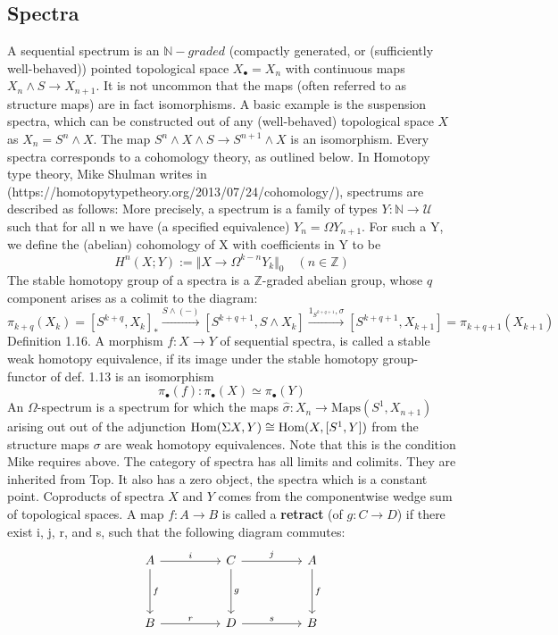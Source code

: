 \subsection{Spectra}
A sequential spectrum is an $\mathbb{N}-graded$ (compactly generated, or (sufficiently well-behaved)) pointed topological space $X_{\bullet} = X_n$ with continuous maps $X_n \land S \to X_{n+1}$. It is not uncommon that the maps (often referred to as structure maps) are in fact isomorphisms.
A basic example is the suspension spectra, which can be constructed out of any (well-behaved) topological space $X$ as $X_n = S^n \land X$. The map $S^n \land X \land S \to S^{n+1} \land X$ is an isomorphism.
Every spectra corresponds to a cohomology theory, as outlined below.
In Homotopy type theory, Mike Shulman writes in (https://homotopytypetheory.org/2013/07/24/cohomology/), spectrums are described as follows:
More precisely, a spectrum is a family of types $Y : \mathbb{N} \to \mathcal{U}$ such that for all n we have (a specified equivalence) $Y_n = \Omega Y_{n+1}$.
For such a Y, we define the (abelian) cohomology of X with coefficients in Y to be
\[
H^n(X;Y) := \Vert X \to \Omega^{k-n} Y_k \Vert_0 \quad (n \in \mathbb{Z})
\]
The stable homotopy group of a spectra is a $\mathbb{Z}$-graded abelian group, whose $q$ component arises as a colimit to the diagram:
\[
\pi_{k+q}(X_k) = [S^{k+q}, X_k]_* \xrightarrow{S \land (-)} [S^{k+q+1}, S \land X_{k}] \xrightarrow{1_{S^{k+q+1}}, \sigma} [S^{k+q+1}, X_{k+1}] = \pi_{k+q+1}(X_{k+1})
\]
Definition 1.16. A morphism $f: X \to Y$ of sequential spectra, is called a stable weak homotopy equivalence, if its image under the stable homotopy group-functor of def. 1.13 is an isomorphism
\[
\pi_{\bullet}(f): \pi_{\bullet}(X) \simeq \pi_{\bullet}(Y)
\]
An $\Omega$-spectrum is a spectrum for which the maps $\hat \sigma : X_n \to \text{Maps}(S^1,X_{n+1})$ arising out out of the adjunction $\operatorname{\text{Hom}}(\Sigma X, Y) \cong \operatorname{\text{Hom}}(X, [S^1, Y])$ from the structure maps $\sigma$ are weak homotopy equivalences. Note that this is the condition Mike requires above.
The category of spectra has all limits and colimits. They are inherited from Top. It also has a zero object, the spectra which is a constant point. Coproducts of spectra $X$ and $Y$ comes from the componentwise wedge sum of topological spaces.
A map $f: A \to B$ is called a \textbf{retract} (of $g : C \to D$) if there exist i, j, r, and s, such that the following diagram commutes:
\[
\ti
A \ar[d, "f"] \ar[r, "i"] & C \ar[d, "g"] \ar[r,"j"] & A \ar[d, "f"]\\
B \ar[r, "r"] & D \ar[r, "s"] & B
\kz
\]
